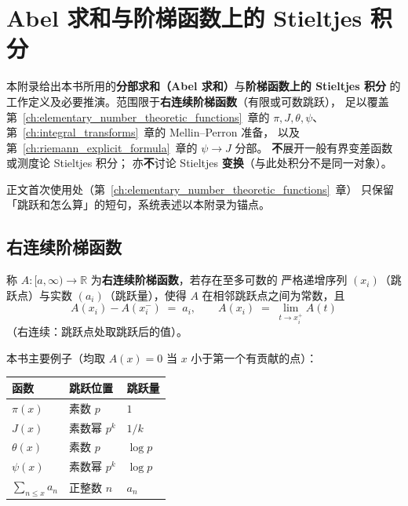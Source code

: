 \chapter{Abel 求和与阶梯函数上的 Stieltjes 积分}
\label{app:abel_stieltjes}

本附录给出本书所用的\textbf{分部求和（Abel 求和）}与\textbf{阶梯函数上的 Stieltjes 积分}
的工作定义及必要推演。范围限于\textbf{右连续阶梯函数}（有限或可数跳跃），
足以覆盖第~\ref{ch:elementary_number_theoretic_functions}~章的
$\pi,J,\theta,\psi$、第~\ref{ch:integral_transforms}~章的 Mellin--Perron 准备，
以及第~\ref{ch:riemann_explicit_formula}~章的 $\psi\to J$ 分部。
\textbf{不}展开一般有界变差函数或测度论 Stieltjes 积分；
亦\textbf{不}讨论 Stieltjes \textbf{变换}（与此处积分不是同一对象）。

正文首次使用处（第~\ref{ch:elementary_number_theoretic_functions}~章）
只保留「跳跃和怎么算」的短句，系统表述以本附录为锚点。

\section{右连续阶梯函数}
\label{sec:app-step-functions}

\begin{definition}{}{}
称 $A:[a,\infty)\to\mathbb{R}$ 为\textbf{右连续阶梯函数}，若存在至多可数的
严格递增序列 $(x_i)$（跳跃点）与实数 $(a_i)$（跳跃量），使得
$A$ 在相邻跳跃点之间为常数，且
\[
  A(x_i)-A(x_i^-) \;=\; a_i,
  \qquad
  A(x_i) \;=\; \lim_{t\to x_i^+} A(t)
\]
（右连续：跳跃点处取跳跃后的值）。
\end{definition}

本书主要例子（均取 $A(x)=0$ 当 $x$ 小于第一个有贡献的点）：
\begin{center}
\renewcommand{\arraystretch}{1.35}
\begin{tabular}{@{}lll@{}}
\toprule
函数 & 跳跃位置 & 跳跃量 \\
\midrule
$\pi(x)$ & 素数 $p$ & $1$ \\
$J(x)$ & 素数幂 $p^k$ & $1/k$ \\
$\theta(x)$ & 素数 $p$ & $\log p$ \\
$\psi(x)$ & 素数幂 $p^k$ & $\log p$ \\
$\displaystyle\sum_{n\le x}a_n$ & 正整数 $n$ & $a_n$ \\
\bottomrule
\end{tabular}
\end{center}

